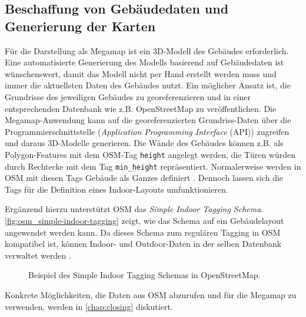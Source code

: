 \subsection{Beschaffung von Gebäudedaten und Generierung der Karten}
Für die Darstellung als Megamap ist ein 3D-Modell des Gebäudes erforderlich.
Eine automatisierte Generierung des Modells basierend auf Gebäudedaten ist wünschenswert, damit das Modell nicht per Hand erstellt werden muss und immer die aktuellsten Daten des Gebäudes nutzt.
Ein möglicher Ansatz ist, die Grundrisse des jeweiligen Gebäudes zu georeferenzieren und in einer entsprechenden Datenbank wie z.B. OpenStreetMap zu veröffentlichen.
Die Megamap-Anwendung kann auf die georeferenzierten Grundriss-Daten über die Programmierschnittstelle (\emph{Application Programming Interface} (API)) zugreifen und daraus 3D-Modelle generieren.
Die Wände des Gebäudes können z.B. als Polygon-Features mit dem OSM-Tag \lstinline{height} angelegt werden, die Türen würden durch Rechtecke mit dem Tag \lstinline{min_height} repräsentiert.
Normalerweise werden in OSM mit diesen Tags Gebäude als Ganzes definiert \parencite{OpenStreetMapFoundation2018b}.
Dennoch lassen sich die Tags für die Definition eines Indoor-Layouts umfunktionieren.

Ergänzend hierzu unterstützt OSM das \emph{Simple Indoor Tagging Schema}.
\autoref{fig:osm_simple-indoor-tagging} zeigt, wie das Schema auf ein Gebäudelayout angewendet werden kann.
Da dieses Schema zum regulären Tagging in OSM kompatibel ist, können Indoor- und Outdoor-Daten in der selben Datenbank verwaltet werden \parencite{OpenStreetMapFoundation2018c}.
\begin{figure}[tbh]
    \centering
    \caption{Beispiel des Simple Indoor Tagging Schemas in OpenStreetMap. %
    }
    \label{fig:osm_simple-indoor-tagging}
\end{figure}

Konkrete Möglichkeiten, die Daten aus OSM abzurufen und für die Megamap zu verwenden, werden in \autoref{chap:closing} diskutiert.
%
\cleardoublepage
